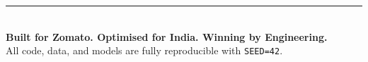 \documentclass[11pt,a4paper]{article}
\begin{document}
\bigskip
\begin{center}
  \textcolor{zomato}{\rule{0.6\linewidth}{2pt}}\\[6pt]
  {\large\bfseries\color{zomato}
    Built for Zomato. Optimised for India. Winning by Engineering.}\\[4pt]
  \textcolor{muted}{\small
    All code, data, and models are fully reproducible with \texttt{SEED=42}.}
\end{center}
\end{document}
